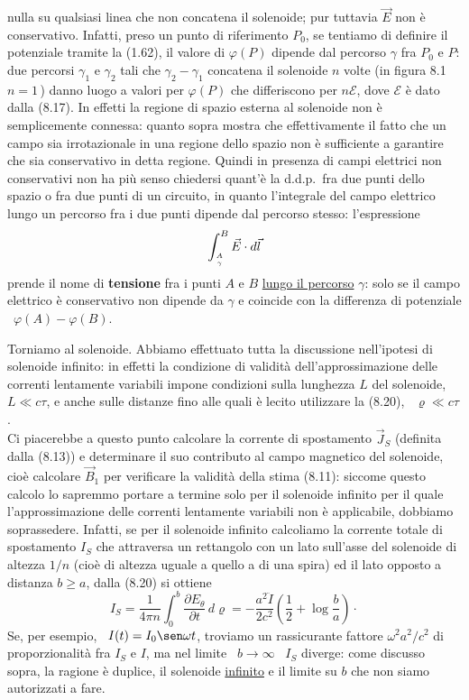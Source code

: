 nulla su qualsiasi linea che non concatena il solenoide; pur tuttavia $\vec E$
non \`e conservativo. Infatti, preso un punto di riferimento $P_0$, se tentiamo
di definire il potenziale tramite la (1.62), il valore di $\varphi(P)$ dipende
dal percorso $\gamma$ fra $P_0$ e $P$: due percorsi $\gamma_1$ e $\gamma_2$ tali
che $\gamma_2-\gamma_1$ concatena il solenoide $n$ volte (in figura 8.1
\ $n=1$\,) danno luogo a valori per $\varphi(P)$ che differiscono per
$n\mathcal E$, dove $\mathcal E$ \`e dato dalla (8.17).
In effetti la regione di spazio esterna al solenoide non \`e semplicemente
connessa: quanto sopra mostra che effettivamente il fatto che un campo sia
irrotazionale in una regione dello spazio non \`e sufficiente a garantire che
sia conservativo in detta regione. Quindi in presenza di campi elettrici non
conservativi non ha pi\`u senso chiedersi quant'\`e la d.d.p.\ fra due punti
dello spazio o fra due punti di un circuito, in quanto l'integrale del campo
elettrico lungo un percorso fra i due punti dipende dal percorso stesso:
l'espressione
\[
  \int_{A\atop\gamma}^B\vec E\cdot d\vec l
\]
prende il nome di \textbf{tensione} fra i punti $A$ e $B$ \underline{lungo il
percorso} $\gamma$: solo se il campo elettrico \`e conservativo non dipende da
$\gamma$ e coincide con la differenza di potenziale \ $\varphi(A)-\varphi(B)$.

Torniamo al solenoide. Abbiamo effettuato tutta la discussione nell'ipotesi di
solenoide infinito: in effetti la condizione di validit\`a dell'approssimazione
delle correnti lentamente variabili impone condizioni sulla lunghezza $L$ del
solenoide, \ $L\ll c\tau$, e anche sulle distanze fino alle quali \`e lecito
utilizzare la (8.20), \ $\varrho\ll c\tau$.\\
Ci piacerebbe a questo punto calcolare la corrente di spostamento $\vec J_S$
\big(definita dalla (8.13)\big) e determinare il suo contributo al campo
magnetico del solenoide, cio\`e calcolare $\vec B_1$ per verificare la
validit\`a della stima (8.11): siccome questo calcolo lo sapremmo portare a
termine solo per il solenoide infinito per il quale l'approssimazione delle
correnti lentamente variabili non \`e applicabile, dobbiamo soprassedere.
Infatti, se per il solenoide infinito calcoliamo la corrente totale di
spostamento $I_S$ che attraversa un rettangolo con un lato sull'asse del
solenoide di altezza $1/n$ (cio\`e di altezza uguale a quello a di una spira) ed
il lato opposto a distanza $b\ge a$, dalla (8.20) si ottiene
\begin{equation}
  I_S=\frac{1}{4\pi n}\int_0^b\frac{\partial E_\theta}{\partial t}\,d\varrho
  =-\frac{a^2\ddot I}{2c^2}\left(\frac{1}{2}+\log\frac{b}{a}\right)\cdot
  \tag{8.21}
\end{equation}
Se, per esempio, \ $I(t)=I_0\sen\omega t$, troviamo un rassicurante fattore
$\omega^2a^2/c^2$ di proporzionalit\`a fra $I_S$ e $I$, ma nel limite
\ $b\to\infty$ \ $I_S$ diverge: come discusso sopra, la ragione \`e duplice, il
solenoide \underline{infinito} e il limite su $b$ che non siamo autorizzati a
fare.

